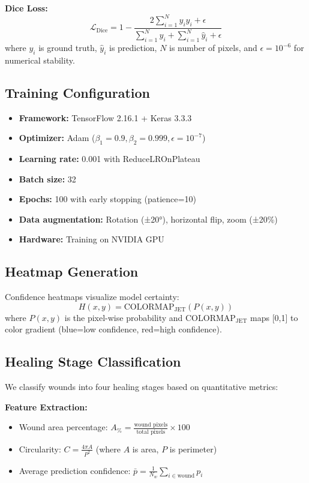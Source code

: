\documentclass[conference]{IEEEtran}
\begin{document}
\textbf{Dice Loss:}
\begin{equation}
\mathcal{L}_{\text{Dice}} = 1 - \frac{2\sum_{i=1}^{N} y_i \hat{y}_i + \epsilon}{\sum_{i=1}^{N} y_i + \sum_{i=1}^{N} \hat{y}_i + \epsilon}
\end{equation}
where $y_i$ is ground truth, $\hat{y}_i$ is prediction, $N$ is number of pixels, and $\epsilon = 10^{-6}$ for numerical stability.

\subsection{Training Configuration}
\begin{itemize}
    \item \textbf{Framework:} TensorFlow 2.16.1 + Keras 3.3.3
    \item \textbf{Optimizer:} Adam ($\beta_1=0.9, \beta_2=0.999, \epsilon=10^{-7}$)
    \item \textbf{Learning rate:} 0.001 with ReduceLROnPlateau
    \item \textbf{Batch size:} 32
    \item \textbf{Epochs:} 100 with early stopping (patience=10)
    \item \textbf{Data augmentation:} Rotation (±20°), horizontal flip, zoom (±20\%)
    \item \textbf{Hardware:} Training on NVIDIA GPU
\end{itemize}

\subsection{Heatmap Generation}
Confidence heatmaps visualize model certainty:
\begin{equation}
H(x,y) = \text{COLORMAP}_{\text{JET}}(P(x,y))
\end{equation}
where $P(x,y)$ is the pixel-wise probability and COLORMAP$_{\text{JET}}$ maps [0,1] to color gradient (blue=low confidence, red=high confidence).

\subsection{Healing Stage Classification}
We classify wounds into four healing stages based on quantitative metrics:

\textbf{Feature Extraction:}
\begin{itemize}
    \item Wound area percentage: $A_{\%} = \frac{\text{wound pixels}}{\text{total pixels}} \times 100$
    \item Circularity: $C = \frac{4\pi A}{P^2}$ (where $A$ is area, $P$ is perimeter)
    \item Average prediction confidence: $\bar{p} = \frac{1}{N_w}\sum_{i \in \text{wound}} p_i$
\end{itemize}
\end{document}
